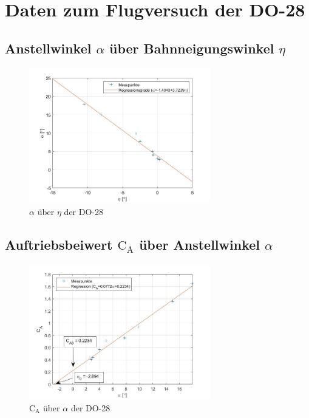 \section{Daten zum Flugversuch der DO-28}

\subsection{Anstellwinkel $\alpha$ über Bahnneigungswinkel $\eta$}

\begin{figure}[H]
	\centering	\includegraphics[width=0.7\textwidth]{./Bilder/alpha_eta_plot.jpg}
	\caption{$\alpha$ über $\eta$ der DO-28}
	\label{fig:alpha_eta_DO28}
\end{figure}

\subsection{Auftriebsbeiwert $\mathrm{C}_{\mathrm{A}}$ über Anstellwinkel $\alpha$}

\begin{figure}[H]
	\centering	\includegraphics[width=0.7\textwidth]{./Bilder/CA_alpha_plot.jpg}
	\caption{$\mathrm{C}_{\mathrm{A}}$ über $\alpha$ der DO-28}
	\label{fig:CA_alpha_DO28}
\end{figure}

